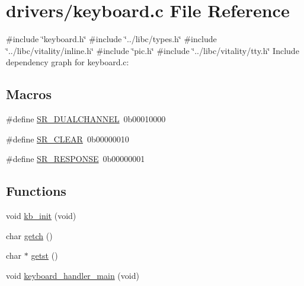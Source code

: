 \hypertarget{a00029}{}\section{drivers/keyboard.c File Reference}
\label{a00029}
{\ttfamily \#include \char`\"{}keyboard.\+h\char`\"{}}\newline
{\ttfamily \#include \char`\"{}../libc/types.\+h\char`\"{}}\newline
{\ttfamily \#include \char`\"{}../libc/vitality/inline.\+h\char`\"{}}\newline
{\ttfamily \#include \char`\"{}pic.\+h\char`\"{}}\newline
{\ttfamily \#include \char`\"{}../libc/vitality/tty.\+h\char`\"{}}\newline
Include dependency graph for keyboard.\+c\+:
\subsection*{Macros}
\begin{DoxyCompactItemize}
\item 
\#define \hyperlink{a00029_addafe32b109f94a57ae4bf1a1dca05e0_addafe32b109f94a57ae4bf1a1dca05e0}{S\+R\+\_\+\+D\+U\+A\+L\+C\+H\+A\+N\+N\+EL}~0b00010000
\item 
\#define \hyperlink{a00029_a8aa66e8bc828742fb4819d7cd2df598d_a8aa66e8bc828742fb4819d7cd2df598d}{S\+R\+\_\+\+C\+L\+E\+AR}~0b00000010
\item 
\#define \hyperlink{a00029_ac9efa716f8185bae296975136b510c30_ac9efa716f8185bae296975136b510c30}{S\+R\+\_\+\+R\+E\+S\+P\+O\+N\+SE}~0b00000001
\end{DoxyCompactItemize}
\subsection*{Functions}
\begin{DoxyCompactItemize}
\item 
void \hyperlink{a00029_aabdb223e5290f3b3c07bc82d075b87d7_aabdb223e5290f3b3c07bc82d075b87d7}{kb\+\_\+init} (void)
\item 
char \hyperlink{a00029_af3facad10e05defa48d45b46eb9ebe7e_af3facad10e05defa48d45b46eb9ebe7e}{getch} ()
\item 
char $\ast$ \hyperlink{a00029_ab88a2e96bbe585e228a5b201435c0240_ab88a2e96bbe585e228a5b201435c0240}{getst} ()
\item 
void \hyperlink{a00029_a1db933be72a0547c4070ba55e6697ba2_a1db933be72a0547c4070ba55e6697ba2}{keyboard\+\_\+handler\+\_\+main} (void)
\end{DoxyCompactItemize}
